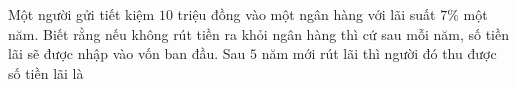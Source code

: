 \begin{ex}
Một người gửi tiết kiệm $10$ triệu đồng vào một ngân hàng với lãi suất $7\%$ một năm. Biết rằng nếu không rút tiền ra khỏi ngân hàng thì cứ sau mỗi năm, số tiền lãi sẽ được nhập vào vốn ban đầu. Sau $5$ năm mới rút lãi thì người đó thu được số tiền lãi là
\end{ex}
